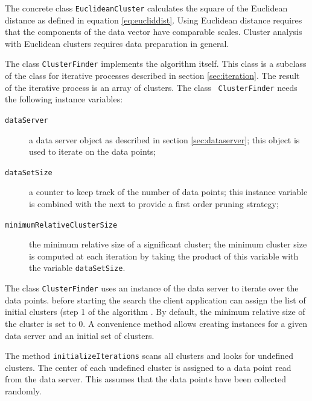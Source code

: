\documentclass[twoside]{book}
\begin{document}

The concrete class {\tt EuclideanCluster} calculates the square of
the Euclidean distance as defined in equation \ref{eq:eucliddist}.
Using Euclidean distance requires that the components of the data
vector have comparable scales. Cluster analysis with Euclidean
clusters requires data preparation in general.

The class {\tt ClusterFinder} implements the algorithm itself.
This class is a subclass of the class for iterative processes
described in section \ref{sec:iteration}. The result of the
iterative process is an array of clusters. The class {\tt
ClusterFinder}  needs the following instance variables:
\begin{description}
  \item[\tt dataServer] a data server object as described in
  section \ref{sec:dataserver}; this object is used to iterate on
  the data points;
  \item[\tt dataSetSize] a counter to keep track of the number of
  data points; this instance variable is combined with the next to
  provide a first order pruning strategy;
  \item[\tt minimumRelativeClusterSize] the minimum relative size
  of a significant cluster; the minimum cluster
  size is computed at each iteration by taking the product of this variable with the
  variable {\tt dataSetSize}.
\end{description}

The class {\tt ClusterFinder} uses an instance of the data server
to iterate over the data points. before starting the search the
client application can assign the list of initial clusters (step 1
of the algorithm . By default, the minimum relative size of the
cluster is set to 0. A convenience method allows creating
instances for a given data server and an initial set of clusters.

The method {\tt initializeIterations} scans all clusters and looks
for undefined clusters. The center of each undefined cluster is
assigned to a data point read from the data server. This assumes
that the data points have been collected randomly.
\end{document}
